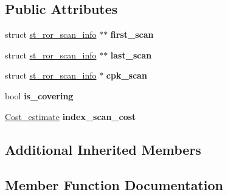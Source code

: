 \subsection*{Public Attributes}
\begin{DoxyCompactItemize}
\item 
\mbox{\label{classTRP__ROR__INTERSECT_ad5e25640562f21f8de405ca9e5c52d03}} 
struct \mbox{\hyperlink{structst__ror__scan__info}{st\+\_\+ror\+\_\+scan\+\_\+info}} $\ast$$\ast$ {\bfseries first\+\_\+scan}
\item 
\mbox{\label{classTRP__ROR__INTERSECT_a969632819baf40ab2ab7d2b2b57aa4f7}} 
struct \mbox{\hyperlink{structst__ror__scan__info}{st\+\_\+ror\+\_\+scan\+\_\+info}} $\ast$$\ast$ {\bfseries last\+\_\+scan}
\item 
\mbox{\label{classTRP__ROR__INTERSECT_afbc0c025f788ffe536d72113b29e09ae}} 
struct \mbox{\hyperlink{structst__ror__scan__info}{st\+\_\+ror\+\_\+scan\+\_\+info}} $\ast$ {\bfseries cpk\+\_\+scan}
\item 
\mbox{\label{classTRP__ROR__INTERSECT_a0d509ab78ceee932d29e9770d765c8fb}} 
bool {\bfseries is\+\_\+covering}
\item 
\mbox{\label{classTRP__ROR__INTERSECT_a6c867d2f916624bd633a23dd43b53694}} 
\mbox{\hyperlink{classCost__estimate}{Cost\+\_\+estimate}} {\bfseries index\+\_\+scan\+\_\+cost}
\end{DoxyCompactItemize}
\subsection*{Additional Inherited Members}


\subsection{Member Function Documentation}
\mbox{\label{classTRP__ROR__INTERSECT_a298712f5cb20fc34554cfe1cc6570bec}} 
